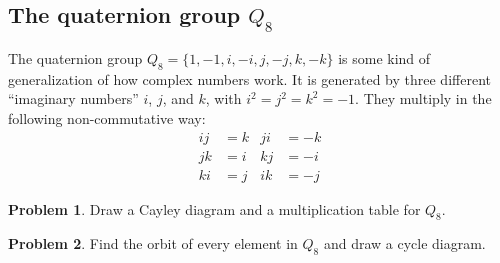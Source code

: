 \documentclass[12pt]{article}
\theoremstyle{definition} %
\newtheorem{problem}{Problem}
\begin{document}
\subsection*{The quaternion group $Q_8$}

The quaternion group $Q_8 = \{1, -1, i, -i, j, -j, k, -k\}$ is some kind of generalization of how complex numbers work. It is generated by three different ``imaginary numbers'' $i$, $j$, and $k$, with $i^2 = j^2 = k^2 = -1$. They multiply in the following non-commutative way:
\begin{align*}
    ij &= k & ji &= -k \\
    jk &= i & kj &= -i \\
    ki &= j & ik &= -j
\end{align*}

\begin{problem}
    Draw a Cayley diagram and a multiplication table for $Q_8$.
\end{problem}

\begin{problem}
    Find the orbit of every element in $Q_8$ and draw a cycle diagram.
\end{problem}
\end{document}
